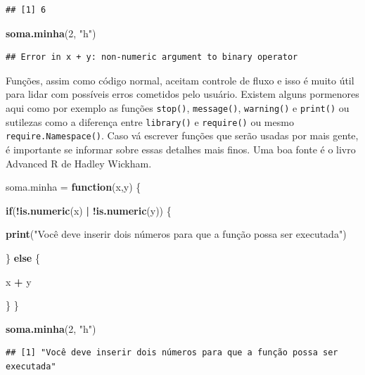 \documentclass[
]{article}
\newenvironment{Shaded}{\begin{snugshade}}{\end{snugshade}}
\newcommand{\ControlFlowTok}[1]{\textcolor[rgb]{0.13,0.29,0.53}{\textbf{#1}}}
\newcommand{\DecValTok}[1]{\textcolor[rgb]{0.00,0.00,0.81}{#1}}
\newcommand{\KeywordTok}[1]{\textcolor[rgb]{0.13,0.29,0.53}{\textbf{#1}}}
\newcommand{\NormalTok}[1]{#1}
\newcommand{\OperatorTok}[1]{\textcolor[rgb]{0.81,0.36,0.00}{\textbf{#1}}}
\newcommand{\StringTok}[1]{\textcolor[rgb]{0.31,0.60,0.02}{#1}}
\begin{document}
\begin{verbatim}
## [1] 6
\end{verbatim}

\begin{Shaded}
\begin{Highlighting}[]
\KeywordTok{soma.minha}\NormalTok{(}\DecValTok{2}\NormalTok{, }\StringTok{"h"}\NormalTok{)}
\end{Highlighting}
\end{Shaded}

\begin{verbatim}
## Error in x + y: non-numeric argument to binary operator
\end{verbatim}

Funções, assim como código normal, aceitam controle de fluxo e isso é
muito útil para lidar com possíveis erros cometidos pelo usuário.
Existem alguns pormenores aqui como por exemplo as funções
\texttt{stop()}, \texttt{message()}, \texttt{warning()} e
\texttt{print()} ou sutilezas como a diferença entre \texttt{library()}
e \texttt{require()} ou mesmo \texttt{require.Namespace()}. Caso vá
escrever funções que serão usadas por mais gente, é importante se
informar sobre essas detalhes mais finos. Uma boa fonte é o livro
Advanced R de Hadley Wickham.

\begin{Shaded}
\begin{Highlighting}[]
\NormalTok{soma.minha =}\StringTok{ }\ControlFlowTok{function}\NormalTok{(x,y) \{}
  
  \ControlFlowTok{if}\NormalTok{(}\OperatorTok{!}\KeywordTok{is.numeric}\NormalTok{(x) }\OperatorTok{|}\StringTok{ }\OperatorTok{!}\KeywordTok{is.numeric}\NormalTok{(y)) \{}

    \KeywordTok{print}\NormalTok{(}\StringTok{"Você deve inserir dois números para que a função possa ser executada"}\NormalTok{)}

\NormalTok{    \} }\ControlFlowTok{else}\NormalTok{ \{}
      
\NormalTok{    x }\OperatorTok{+}\StringTok{ }\NormalTok{y}
  
\NormalTok{    \}}
\NormalTok{\}}

\KeywordTok{soma.minha}\NormalTok{(}\DecValTok{2}\NormalTok{, }\StringTok{"h"}\NormalTok{)}
\end{Highlighting}
\end{Shaded}

\begin{verbatim}
## [1] "Você deve inserir dois números para que a função possa ser executada"
\end{verbatim}
\end{document}
